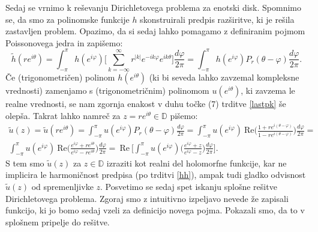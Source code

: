 \documentclass[mat1]{fmfdelo}
\begin{document}
    Sedaj se vrnimo k reševanju Dirichletovega problema za enotski disk. 
    Spomnimo se, da smo za polinomske funkcije $h$ skonstruirali predpis razširitve, ki je rešila zastavljen problem. 
    Opazimo, da si sedaj lahko pomagamo z definiranim pojmom Poissonovega jedra in zapišemo:
    $$
    \widetilde{h}(r e^{i \theta}) = \int_{-\pi}^{\pi}{h(e^{i \varphi}) \bigg[\sum_{k = - \infty}^{\infty} r^{|k|} e^{- i k \varphi} e^{i k \theta}} \bigg]\frac{d \varphi}{2 \pi} = 
    \int_{-\pi}^{\pi}{h(e^{i \varphi}) P_r(\theta - \varphi)\frac{d \varphi}{2 \pi}}.
    $$
    Če (trigonometričen) polinom $h(e^{i\theta})$ (ki  bi seveda lahko zavzemal kompleksne vrednosti) zamenjamo s (trigonometričnim) polinomom $u(e^{i\theta})$, ki zavzema le realne vrednosti, se nam zgornja enakost v duhu 
    točke (7) trditve \ref{lastpk} še olepša. Takrat lahko namreč za $z = re^{i\theta} \in \mathbb{D}$ pišemo:
    \begin{equation}
        \label{realnidel}
        \begin{split}
            \widetilde{u}(z) = \widetilde{u}(r e^{i \theta}) = \int_{-\pi}^{\pi}{u(e^{i \varphi}) P_r(\theta - \varphi)\frac{d \varphi}{2 \pi}} = \int_{-\pi}^{\pi}{u(e^{i \varphi})~\text{Re}\bigg(\frac{1+re^{i(\theta - \varphi)}}{1-re^{i(\theta - \varphi)}}\bigg)\frac{d \varphi}{2 \pi}}= \\
            \int_{-\pi}^{\pi}{u(e^{i \varphi})~\text{Re}\bigg(\frac{e^{i\varphi}+re^{i\theta}}{e^{i\varphi}-re^{i\theta}}\bigg)\frac{d \varphi}{2 \pi}}=~\text{Re}~\bigg[\int_{-\pi}^{\pi}{u(e^{i \varphi})\bigg(\frac{e^{i\varphi}+z}{e^{i\varphi}-z}\bigg)\frac{d \varphi}{2 \pi}}\bigg].
        \end{split}
    \end{equation}
    S tem smo $\widetilde{u}(z)$ za $z \in \mathbb{D}$ izraziti kot realni del holomorfne funkcije, kar ne implicira le harmoničnost predpisa (po trditvi \ref{hh}), ampak tudi gladko odvisnost $\widetilde{u}(z)$ od spremenljivke $z$.
    \newline
    Posvetimo se sedaj spet iskanju splošne rešitve Dirichletovega problema. Zgoraj smo z intuitivno izpeljavo nevede že zapisali funkcijo, ki jo bomo sedaj vzeli za definicijo novega pojma. Pokazali smo, da to v splošnem pripelje do rešitve.
\end{document}

